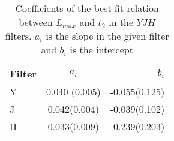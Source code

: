 \begin{table}
\caption{Coefficients of the best fit relation between $L_{max}$ and $t_2$ in the $YJH$ filters. $a_i$ is the slope in the given filter and $b_i$ is the intercept}
\begin{center}
\begin{tabular}{lcr}
\hline
Filter &	$a_i$ & $b_i$ \\
\hline
Y & 0.040 (0.005) &	-0.055(0.125)  	\\
J & 0.042(0.004)	&	-0.039(0.102)	\\
H & 0.033(0.009)	&	-0.239(0.203)	\\
\hline
\end{tabular}
\end{center}
\label{tab:eqcoeff}
\end{table}








